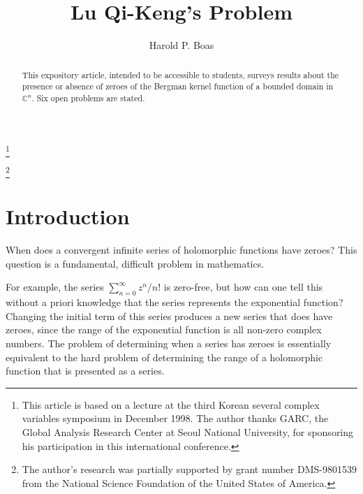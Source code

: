 \documentclass[12pt]{amsart}
\theoremstyle{definition}
\newcommand{\C}{\mathbb{C}}
\begin{document}
\title{Lu Qi-Keng's Problem}

\author{Harold P. Boas}

\address{Department of Mathematics, Texas A\&M University,
  College Station, TX 77843--3368, USA}


\thanks{This article is based on a lecture at the third Korean
  several complex variables symposium in December 1998.  The
  author thanks GARC, the Global Analysis Research Center at
  Seoul National University, for sponsoring his participation in
  this international conference.}  

\thanks{The author's research was partially supported by grant
  number DMS-9801539 from the National Science Foundation of the
  United States of America.}


\begin{abstract}
  This expository article, intended to be accessible to students,
  surveys results about the presence or absence of zeroes of the
  Bergman kernel function of a bounded domain in~\(\C^n\). Six
  open problems are stated.
\end{abstract}


\maketitle

\setcounter{tocdepth}{1}
\tableofcontents

\section{Introduction}
When does a convergent infinite series of holomorphic functions
have zeroes?  This question is a fundamental, difficult problem
in mathematics.

For example, the series \(\sum_{n=0}^\infty z^n/n!\) is
zero-free, but how can one tell this without a priori knowledge
that the series represents the exponential function? Changing the
initial term of this series produces a new series that does have
zeroes, since the range of the exponential function is all
non-zero complex numbers. The problem of determining when a
series has zeroes is essentially equivalent to the hard problem
of determining the range of a holomorphic function that is
presented as a series.
\end{document}
